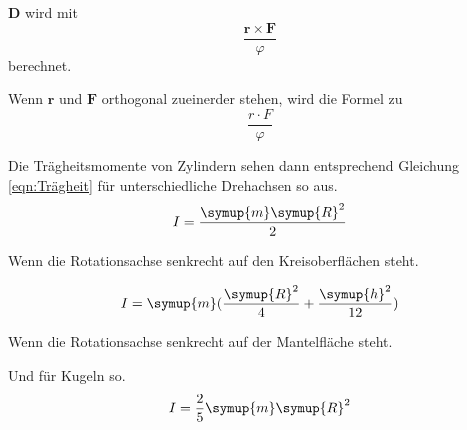 $\symbf{D}$ wird mit
\begin{equation}
\frac{\symbf{r}\times \symbf{F}}{\varphi}
\label{eqn:D}
\end{equation}
berechnet.

Wenn $\symbf{r}$ und $\symbf{F}$ orthogonal zueinerder stehen, wird die Formel zu
\begin{equation}
    \frac{r \cdot F}{\varphi}
    \label{eqn:D2}
\end{equation}

Die Trägheitsmomente von Zylindern sehen dann entsprechend Gleichung \ref{eqn:Trägheit} für unterschiedliche
Drehachsen so aus.
\begin{equation}
    I=\frac{\symup{m}\symup{R}^2}{2} 
    \label{eqn:Trägheit_Zyl_1} 
\end{equation}
    \begin{center} 
    Wenn die Rotationsachse senkrecht auf den Kreisoberflächen steht.
    \end{center}
\begin{equation}
    I=\symup{m} (\frac{\symup{R}^2}{4}+\frac{\symup{h}^2}{12}) 
    \label{eqn:Trägheit_Zyl_2}  
\end{equation}
\begin{center}   
    Wenn die Rotationsachse senkrecht auf der Mantelfläche steht.
\end{center}

Und für Kugeln so.
\begin{equation}
    I=\frac{2}{5}\symup{m}\symup{R}^2
    \label{eqn:Trägheit_Kugel}
\end{equation}
\cite{V101}

